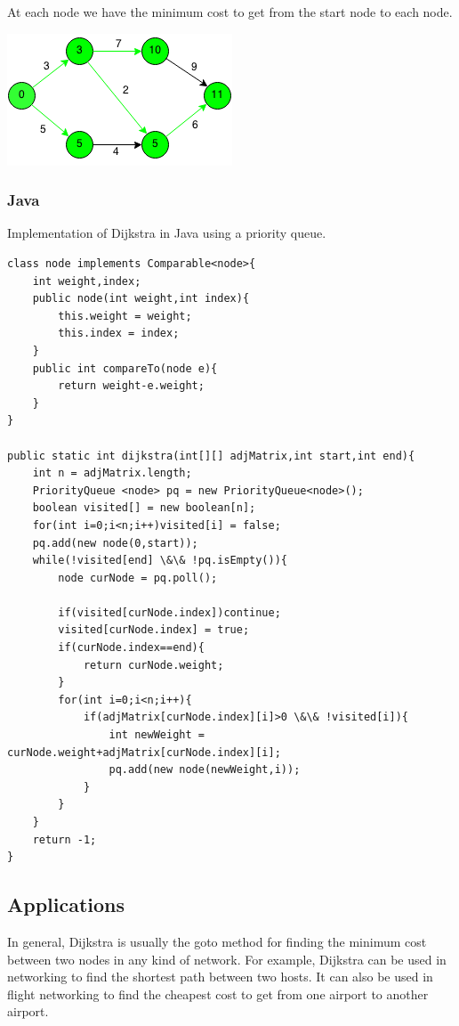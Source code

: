 \documentclass[11pt,oneside]{book}
\makeatletter
\def\maxwidth#1{\ifdim\Gin@nat@width>#1 #1\else\Gin@nat@width\fi}
\makeatother
\begin{document}
At each node we have the minimum cost to get from the start node to each node.

\includegraphics[width=\maxwidth{\textwidth}]{djikstra6.png}

\subsubsection{Java}

Implementation of Dijkstra in Java using a priority queue.

\begin{lstlisting}
class node implements Comparable<node>{
    int weight,index;
    public node(int weight,int index){
        this.weight = weight;
        this.index = index;
    }
    public int compareTo(node e){
        return weight-e.weight;
    }
}

public static int dijkstra(int[][] adjMatrix,int start,int end){
    int n = adjMatrix.length;
    PriorityQueue <node> pq = new PriorityQueue<node>();
    boolean visited[] = new boolean[n];
    for(int i=0;i<n;i++)visited[i] = false;
    pq.add(new node(0,start));
    while(!visited[end] \&\& !pq.isEmpty()){
        node curNode = pq.poll();
    
        if(visited[curNode.index])continue;
        visited[curNode.index] = true;
        if(curNode.index==end){
            return curNode.weight;
        }
        for(int i=0;i<n;i++){
            if(adjMatrix[curNode.index][i]>0 \&\& !visited[i]){
                int newWeight = curNode.weight+adjMatrix[curNode.index][i];
                pq.add(new node(newWeight,i));
            }
        }
    }
    return -1;
}
\end{lstlisting}

\subsection{Applications}

In general, Dijkstra is usually the goto method for finding the minimum cost between two nodes in any kind of network. For example, Dijkstra can be used in networking to find the shortest path between two hosts. It can also be used in flight networking to find the cheapest cost to get from one airport to another airport.
\end{document}
